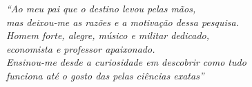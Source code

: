
\vspace*{\fill}
  \begin{flushright}
    \textit{``Ao meu pai que o destino levou pelas mãos,\\
    	      mas deixou-me as razões e a motivação dessa pesquisa.\\ 
    	      Homem forte, alegre, músico e militar dedicado,\\
    	      economista e professor apaixonado.\\
    	      Ensinou-me desde a curiosidade em descobrir como tudo\\ funciona até o gosto das pelas ciências exatas''
        	  }
  \end{flushright}